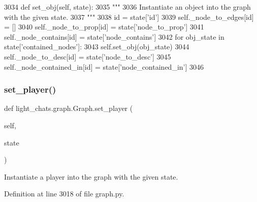 \begin{DoxyCode}
3034     \textcolor{keyword}{def }set\_obj(self, state):
3035         \textcolor{stringliteral}{"""}
3036 \textcolor{stringliteral}{        Instantiate an object into the graph with the given state.}
3037 \textcolor{stringliteral}{        """}
3038         id = state[\textcolor{stringliteral}{'id'}]
3039         self.\_node\_to\_edges[id] = []
3040         self.\_node\_to\_prop[id] = state[\textcolor{stringliteral}{'node\_to\_prop'}]
3041         self.\_node\_contains[id] = state[\textcolor{stringliteral}{'node\_contains'}]
3042         \textcolor{keywordflow}{for} obj\_state \textcolor{keywordflow}{in} state[\textcolor{stringliteral}{'contained\_nodes'}]:
3043             self.set\_obj(obj\_state)
3044         self.\_node\_to\_desc[id] = state[\textcolor{stringliteral}{'node\_to\_desc'}]
3045         self.\_node\_contained\_in[id] = state[\textcolor{stringliteral}{'node\_contained\_in'}]
3046 
\end{DoxyCode}
\mbox{\label{classlight__chats_1_1graph_1_1Graph_a4130e8f504f9a6eeafbc83a8a38a6efb}} 
\subsubsection{\texorpdfstring{set\+\_\+player()}{set\_player()}}
{\footnotesize\ttfamily def light\+\_\+chats.\+graph.\+Graph.\+set\+\_\+player (\begin{DoxyParamCaption}\item[{}]{self,  }\item[{}]{state }\end{DoxyParamCaption})}

\begin{DoxyVerb}Instantiate a player into the graph with the given state.
\end{DoxyVerb}
 

Definition at line 3018 of file graph.\+py.


